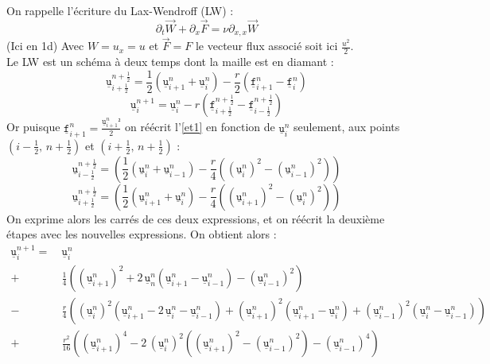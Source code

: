 \documentclass[a4paper,12pt]{article}
\newcommand{\bepar}[1]{
	\left( #1 \right)  
}
\newcommand{\uin}[2]{
	\underline{\texttt{u}}_{#1}^{#2}
}
\newcommand{\ui}[1]{
	\underline{\texttt{u}}_{#1}^{n}
}
\numberwithin{equation}{section} %
\begin{document}
On rappelle l'écriture du Lax-Wendroff (LW) :
\begin{equation}
\partial_t \vec{W} +  \partial_x \vec{F} = \nu \partial_{x,x} \vec{W}
\end{equation}
(Ici en 1d) Avec $W = u_x = u $ et $\vec{F} = F$ le vecteur flux associé soit ici $\displaystyle \frac{u^2}{2}$.\\
Le LW est un schéma à deux temps dont la maille est en diamant :
\begin{equation} \tag{\'etape 1}
\uin{i + \frac{1}{2}}{n + \frac{1}{2}} = \frac{1}{2} \bepar{\uin{i+1}{n} + \uin{i}{n}} - \frac{r}{2} \bepar{\underline{\texttt{f}}_{i+1}^n - \underline{\texttt{f}}_{i}^n} \label{et1}
\end{equation}
\begin{equation} \tag{\'etape 2}
\uin{i}{n+1} = \uin{i}{n} - r \bepar{\underline{\texttt{f}}_{i+\frac{1}{2}}^{n + \frac{1}{2}} - \underline{\texttt{f}}_{i-\frac{1}{2}}^{n + \frac{1}{2}}} \label{et2}
\end{equation}
Or puisque $\displaystyle \underline{\texttt{f}}_{i+1}^n = \frac{\uin{i+1}{n} ²}{2}$ on réécrit l'\ref{et1} en fonction de $\uin{i}{n}$ seulement, aux points $\bepar{ i - \frac{1}{2},\, n+\frac{1}{2}}$ et $\bepar{ i + \frac{1}{2},\, n+\frac{1}{2}}$   :
\begin{equation}
\uin{i - \frac{1}{2}}{n+\frac{1}{2}} = \bepar{\frac{1}{2}\bepar{\uin{i}{n}+\uin{i-1}{n}} - \frac{r}{4}\bepar{\bepar{\uin{i}{n}}^2 - \bepar{\uin{i-1}{n}}^2}}
\end{equation}
\begin{equation}
\uin{i + \frac{1}{2}}{n+\frac{1}{2}} = \bepar{\frac{1}{2}\bepar{\uin{i+1}{n}+\uin{i}{n}} - \frac{r}{4}\bepar{\bepar{\uin{i+1}{n}}^2 - \bepar{\uin{i}{n}}^2}}
\end{equation}
On exprime alors les carrés de ces deux expressions, et on réécrit la deuxième étapes avec les nouvelles expressions. On obtient alors :
\begin{align*}
\uin{i}{n+1} =\  &\uin{i}{n} \\
 +\ & \frac{1}{4} \bepar{\bepar{\ui{i+1}}^2 + 2\, \ui{n}\bepar{\ui{i+1} - \ui{i-1}} - \bepar{\ui{i-1}}^2} \\
- & \frac{r}{4}\bepar{\bepar{\ui{i}}^2\bepar{\ui{i+1} -2\, \ui{i} - \ui{i-1}} + \bepar{\ui{i+1}}^2\bepar{\ui{i+1} - \ui{i}} + \bepar{\ui{i-1}}^2\bepar{\ui{i} - \ui{i-1}}} \\
+\ & \frac{r^2}{16} \bepar{\bepar{\ui{i+1}}^4 -2\,\bepar{\ui{i}}^2 \bepar{\bepar{\ui{i+1}}^2 - \bepar{\ui{i-1}}^2} - \bepar{\ui{i-1}}^4}
\end{align*}
\end{document}
